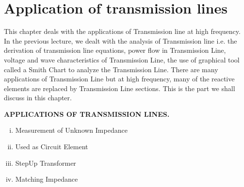 \chapter{Application of transmission lines}
This chapter deals with the applications of Transmission line at high frequency. In the previous lecture, we dealt with the
analysis of Transmission line i.e. the derivation of transmission line equations, power flow in Transmission Line, voltage and wave characteristics of Transmission Line, the use of graphical tool called a Smith Chart to analyze the Transmission Line.
There are many applications of Transmission Line but at high frequency, many of the reactive elements are replaced by Transmission Line sections. This is the part we shall discuss in this chapter.

\textbf{APPLICATIONS OF TRANSMISSION LINES.}
\begin{enumerate}[(i)]
\item Measurement of Unknown Impedance 
\item Used as Circuit Element
\item StepUp Transformer 
\item Matching Impedance
\end{enumerate}

